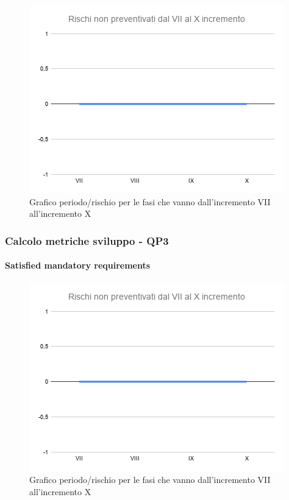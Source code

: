 	\begin{figure}[H]
			\centering
			\includegraphics[width=0.8\linewidth]{./res/images/RischiNonPreven_4.png}
			\caption{Grafico periodo/rischio per le fasi che vanno dall'incremento VII all'incremento X}
			\label{fig:Grafico periodo/rischio per le fasi che vanno dall'incremento VII all'incremento X}
	\end{figure}

\subsubsection{Calcolo metriche sviluppo - QP3}
\paragraph{Satisfied mandatory requirements}
	\begin{figure}[H]
			\centering%
			\includegraphics[width=0.8\linewidth]{./res/images/RischiNonPreven_4.png}
			\caption{Grafico periodo/rischio per le fasi che vanno dall'incremento VII all'incremento X}
			\label{fig:Grafico periodo/rischio per le fasi che vanno dall'incremento VII all'incremento X}
	\end{figure}
